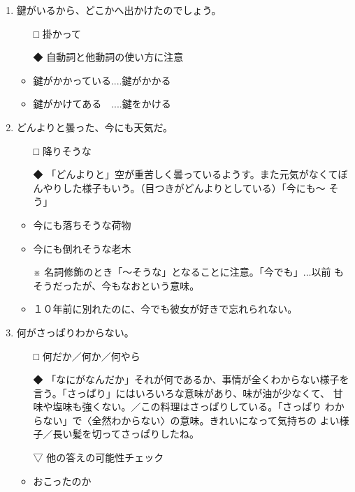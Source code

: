 \documentclass[
uplatex,
b5paper,
10pt,
dvipdfmx
]{jsbook}
\begin{document}
\begin{enumerate}
\item 鍵が\underline{\hspace{3zw}}いるから、どこかへ出かけたのでしょう。

\begin{itemize}
\item[□] 掛かって
\item[◆] 自動詞と他動詞の使い方に注意
\end{itemize}

\begin{itemize}
\item 鍵がかかっている....鍵がかかる
\item 鍵がかけてある　....鍵をかける
\end{itemize}


\item どんよりと曇った、今にも\underline{\hspace{3zw}}天気だ。

\begin{itemize}
\item[□] 降りそうな
\item[◆]「どんよりと」空が重苦しく曇っているようす。また元気がなくてぼ
	 んやりした様子もいう。（目つきがどんよりとしている）「今にも〜
	 そう」
\end{itemize}

\begin{itemize}
\item 今にも落ちそうな荷物
\item 今にも倒れそうな老木
\item[※] 名詞修飾のとき「〜そうな」となることに注意。「今でも」...以前
	  もそうだったが、今もなおという意味。
\item １０年前に別れたのに、今でも彼女が好きで忘れられない。
\end{itemize}

\item 何が\underline{\hspace{3zw}}さっぱりわからない。

\begin{itemize}
\item[□] 何だか／何か／何やら
\item[◆]「なにがなんだか」それが何であるか、事情が全くわからない様子を
	 言う。「さっぱり」にはいろいろな意味があり、味が油が少なくて、
	 甘味や塩味も強くない。／この料理はさっぱりしている。「さっぱり
	 わからない」で〈全然わからない〉の意味。きれいになって気持ちの
	 よい様子／長い髪を切ってさっぱりしたね。
\item[▽] 他の答えの可能性チェック
\item おこったのか


\end{itemize}
\end{enumerate}
\end{document}
